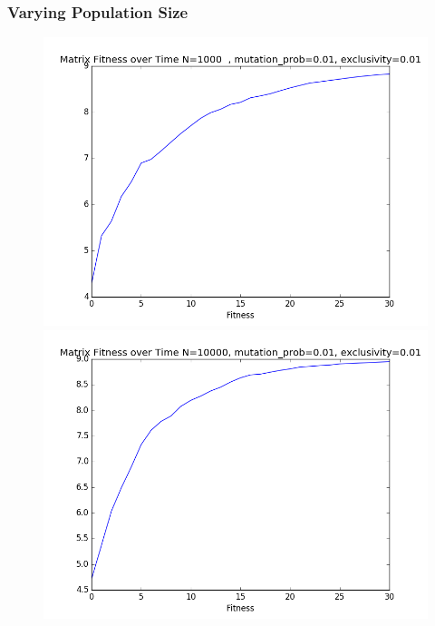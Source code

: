 \documentclass{article}
\begin{document}
\subsubsection{Varying Population Size}

\begin{figure}[H]
\centering
\begin{minipage}{.5\textwidth}
  \centering
  \includegraphics[width=1\linewidth]{../graphs/population1.png}
\end{minipage}%
\begin{minipage}{.5\textwidth}
  \centering
  \includegraphics[width=1\linewidth]{../graphs/population2.png}
\end{minipage}
\end{figure}
\end{document}
